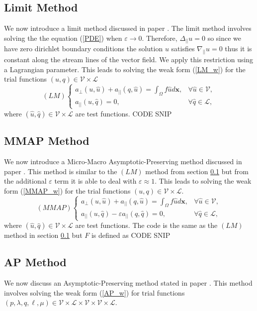 \documentclass[12pt]{ociamthesis}
\begin{document}
\subsection{Limit Method} \label{LM}
We now introduce a limit method discussed in paper \cite{AP}. The limit method involves solving the the equation (\ref{PDE}) when $\varepsilon \rightarrow 0$. Therefore, $\Delta_{||}u=0$ so since we have zero dirichlet boundary conditions the solution $u$ satisfies $\nabla_{||}u=0$ thus it is constant along the stream lines of the vector field. We apply this restriction using a Lagrangian parameter. This leads to solving the weak form (\ref{LM_w}) for the trial functions $(u, q) \in \mathcal{V} \times \mathcal{L}$ 
\begin{equation} \label{LM_w}
(LM)
\begin{cases}
a_{\perp}(u, \hat{u}) + a_{||}(q, \hat{u}) = \int_{\Omega} f \hat{u} d\mathbf{x}, 
&\forall \hat{u} \in \mathcal{V},\\
a_{||}(u, \hat{q}) = 0, & \forall \hat{q} \in \mathcal{L},
\end{cases}
\end{equation}
where $(\hat{u}, \hat{q}) \in \mathcal{V} \times \mathcal{L}$ are test functions.
CODE SNIP

\subsection{MMAP Method} \label{MMAP}
We now introduce a Micro-Macro Asymptotic-Preserving method discussed in paper \cite{MMAP}. This method is similar to the $(LM)$ method from section \ref{LM} but from the additional $\varepsilon$ term it is able to deal with $\varepsilon \approx 1$. This leads to solving the weak form (\ref{MMAP_w}) for the trial functions $(u, q) \in  \mathcal{V} \times \mathcal{L}$. 
\begin{equation} \label{MMAP_w}
(MMAP)
\begin{cases}
a_{\perp}(u, \hat{u}) + a_{||}(q, \hat{u}) = \int_{\Omega} f \hat{u} d\mathbf{x}, 
&\forall \hat{u} \in \mathcal{V}, \\
a_{||}(u, \hat{q}) - \varepsilon a_{||}(q, \hat{q}) = 0, 
&\forall \hat{q} \in \mathcal{L},
\end{cases}
\end{equation}
where $(\hat{u}, \hat{q}) \in \mathcal{V}\times \mathcal{L} $ are test functions. The code is the same as the $(LM)$ method in section \ref{LM} but $F$ is defined as 
CODE SNIP

\subsection{AP Method} \label{AP}
We now discuss an Asymptotic-Preserving method stated in paper \cite{AP}. This method involves solving the weak form (\ref{AP_w}) for trial functions $(p, \lambda, q, \ell, \mu) \in \mathcal{V} \times \mathcal{L}  \times \mathcal{V}  \times \mathcal{V}  \times \mathcal{L}$.
\end{document}
